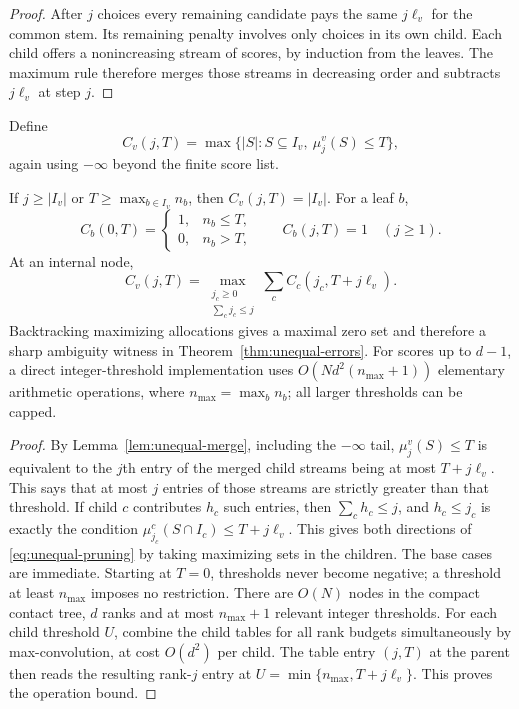 \begin{proof}
After $j$ choices every remaining candidate pays the same $j\ell_v$
for the common stem.  Its remaining penalty involves only choices in its
own child.  Each child offers a nonincreasing stream of scores, by
induction from the leaves.  The maximum rule therefore merges those
streams in decreasing order and subtracts $j\ell_v$ at step $j$.
\end{proof}

Define
\[
 C_v(j,T)=\max\{|S|:S\subseteq I_v,\ \mu_j^v(S)\le T\},
\]
again using $-\infty$ beyond the finite score list.

\begin{theorem}
\label{thm:unequal-tree}
If $j\ge|I_v|$ or $T\ge\max_{b\in I_v}n_b$, then $C_v(j,T)=|I_v|$.
For a leaf $b$,
\[
 C_b(0,T)=\begin{cases}1,&n_b\le T,\\0,&n_b>T,\end{cases}
 \qquad C_b(j,T)=1\quad(j\ge1).
\]
At an internal node,
\begin{equation}
 C_v(j,T)=
 \max_{\substack{j_c\ge0\\\sum_c j_c\le j}}
       \sum_c C_c(j_c,T+j\ell_v).
 \label{eq:unequal-pruning}
\end{equation}
Backtracking maximizing allocations gives a maximal zero set and therefore
a sharp ambiguity witness in Theorem~\ref{thm:unequal-errors}.
For scores up to $d-1$, a direct integer-threshold implementation uses
$O(Nd^2(n_{\max}+1))$ elementary arithmetic operations, where
$n_{\max}=\max_b n_b$; all larger thresholds can be capped.
\end{theorem}

\begin{proof}
By Lemma~\ref{lem:unequal-merge}, including the $-\infty$ tail,
$\mu_j^v(S)\le T$ is equivalent to the $j$th entry of the merged child
streams being at most $T+j\ell_v$.  This says that at most $j$ entries
of those streams are strictly greater than that threshold.  If child
$c$ contributes $h_c$ such entries, then $\sum_c h_c\le j$, and
$h_c\le j_c$ is exactly the condition
$\mu_{j_c}^c(S\cap I_c)\le T+j\ell_v$.  This gives both directions of
\eqref{eq:unequal-pruning} by taking maximizing sets in the children.
The base cases are immediate.  Starting at $T=0$, thresholds never
become negative; a threshold at least $n_{\max}$ imposes no restriction.
There are $O(N)$ nodes in the compact contact tree, $d$ ranks and at
most $n_{\max}+1$ relevant integer thresholds.  For each child threshold $U$, combine the child tables for all rank
budgets simultaneously by max-convolution, at cost $O(d^2)$ per child.
The table entry $(j,T)$ at the parent then reads the resulting rank-$j$
entry at $U=\min\{n_{\max},T+j\ell_v\}$.  This proves the operation bound.
\end{proof}

